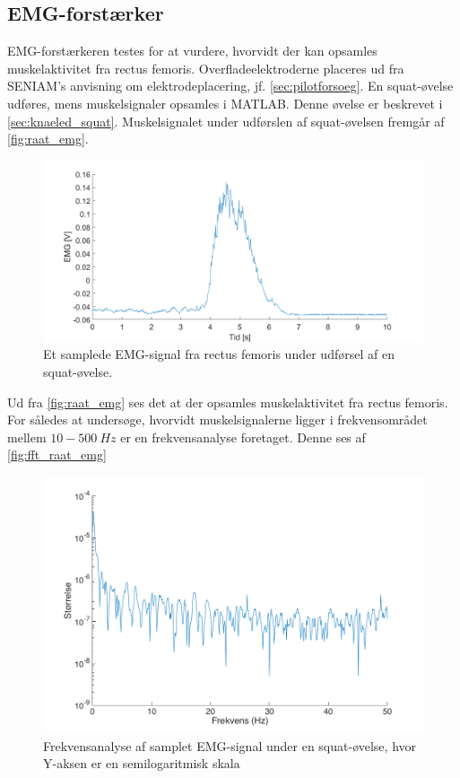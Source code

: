 \subsection{EMG-forstærker}

EMG-forstærkeren testes for at vurdere, hvorvidt der kan opsamles muskelaktivitet fra rectus femoris. Overfladeelektroderne placeres ud fra SENIAM's anvisning om elektrodeplacering, jf. \autoref{sec:pilotforsoeg}. En squat-øvelse udføres, mens muskelsignaler opsamles i MATLAB. Denne øvelse er beskrevet i \autoref{sec:knaeled_squat}. Muskelsignalet under udførslen af squat-øvelsen fremgår af \autoref{fig:raat_emg}. 

\begin{figure}[H]
\centering
\includegraphics[width=1\textwidth]{figures/raat_EMG_test}
\caption{Et samplede EMG-signal fra rectus femoris under udførsel af en squat-øvelse.}
\label{fig:raat_emg}
\end{figure}

\noindent
Ud fra \autoref{fig:raat_emg} ses det at der opsamles muskelaktivitet fra rectus femoris. For således at undersøge, hvorvidt muskelsignalerne ligger i frekvensområdet mellem $10-500~Hz$ er en frekvensanalyse foretaget. Denne ses af \autoref{fig:fft_raat_emg}

\begin{figure}[H]
\centering
\includegraphics[width=1\textwidth]{figures/fft_raat_EMG}
\caption{Frekvensanalyse af samplet EMG-signal under en squat-øvelse, hvor Y-aksen er en semilogaritmisk skala}
\label{fig:fft_raat_emg}
\end{figure}

